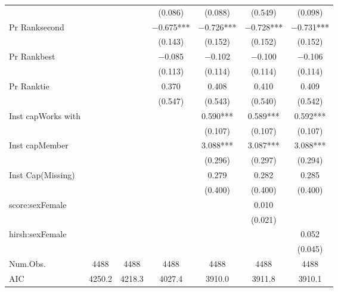 \begin{table}
\begin{tabular}[t]{lcccccc}
 &  &  & (\num{0.086}) & (\num{0.088}) & (\num{0.549}) & (\num{0.098})\\
Pr Ranksecond &  &  & \num{-0.675}*** & \num{-0.726}*** & \num{-0.728}*** & \num{-0.731}***\\
 &  &  & (\num{0.143}) & (\num{0.152}) & (\num{0.152}) & (\num{0.152})\\
Pr Rankbest &  &  & \num{-0.085} & \num{-0.102} & \num{-0.100} & \num{-0.106}\\
 &  &  & (\num{0.113}) & (\num{0.114}) & (\num{0.114}) & (\num{0.114})\\
Pr Ranktie &  &  & \num{0.370} & \num{0.408} & \num{0.410} & \num{0.409}\\
 &  &  & (\num{0.547}) & (\num{0.543}) & (\num{0.540}) & (\num{0.542})\\
Inst capWorks with &  &  &  & \num{0.590}*** & \num{0.589}*** & \num{0.592}***\\
 &  &  &  & (\num{0.107}) & (\num{0.107}) & (\num{0.107})\\
Inst capMember &  &  &  & \num{3.088}*** & \num{3.087}*** & \num{3.088}***\\
 &  &  &  & (\num{0.296}) & (\num{0.297}) & (\num{0.294})\\
Inst Cap(Missing) &  &  &  & \num{0.279} & \num{0.282} & \num{0.285}\\
 &  &  &  & (\num{0.400}) & (\num{0.400}) & (\num{0.400})\\
score:sexFemale &  &  &  &  & \num{0.010} & \\
 &  &  &  &  & (\num{0.021}) & \\
hirsh:sexFemale &  &  &  &  &  & \num{0.052}\\
 &  &  &  &  &  & (\num{0.045})\\
\midrule
Num.Obs. & \num{4488} & \num{4488} & \num{4488} & \num{4488} & \num{4488} & \num{4488}\\
AIC & \num{4250.2} & \num{4218.3} & \num{4027.4} & \num{3910.0} & \num{3911.8} & \num{3910.1}\\
\bottomrule
\end{tabular}
\end{table}
